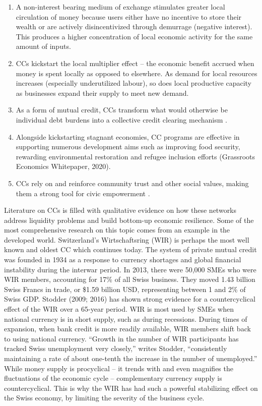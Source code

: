 \documentclass[12pt]{article}
\begin{document}
\begin{enumerate}
    \item A non-interest bearing medium of exchange stimulates greater local circulation of money because users either have no incentive to store their wealth or are actively disincentivized through demurrage (negative interest). This produces a higher concentration of local economic activity for the same amount of inputs.
    \item CCs kickstart the local multiplier effect – the economic benefit accrued when money is spent locally as opposed to elsewhere. As demand for local resources increases (especially underutilized labour), so does local productive capacity as businesses expand their supply to meet new demand.
    \item As a form of mutual credit, CCs transform what would otherwise be individual debt burdens into a collective credit clearing mechanism \citep{fleischman2020liquidity}.
    \item Alongside kickstarting stagnant economies, CC programs are effective in supporting numerous development aims such as improving food security, rewarding environmental restoration and refugee inclusion efforts (Grassroots Economics Whitepaper, 2020).
    \item CCs rely on and reinforce community trust and other social values, making them a strong tool for civic empowerment \citep{dini2019alter}.
\end{enumerate}

Literature on CCs is filled with qualitative evidence on how these networks address liquidity problems and build bottom-up economic resilience. Some of the most comprehensive research on this topic comes from an example in the developed world. Switzerland’s Wirtschaftsring (WIR) is perhaps the most well known and oldest CC which continues today. The system of private mutual credit was founded in 1934 as a response to currency shortages and global financial instability during the interwar period. In 2013, there were 50,000 SMEs who were WIR members, accounting for 17\% of all Swiss business. They moved 1.43 billion Swiss Francs in trade, or \$1.59 billion USD, representing between 1 and 2\% of Swiss GDP. Stodder (2009; 2016) has shown strong evidence for a countercyclical effect of the WIR over a 65-year period. WIR is most used by SMEs when national currency is in short supply, such as during recessions. During times of expansion, when bank credit is more readily available, WIR members shift back to using national currency. “Growth in the number of WIR participants has tracked Swiss unemployment very closely,” writes Stodder, “consistently maintaining a rate of about one-tenth the increase in the number of unemployed.” While money supply is procyclical – it trends with and even magnifies the fluctuations of the economic cycle – complementary currency supply is countercyclical. This is why the WIR has had such a powerful stabilizing effect on the Swiss economy, by limiting the severity of the business cycle.
\end{document}
